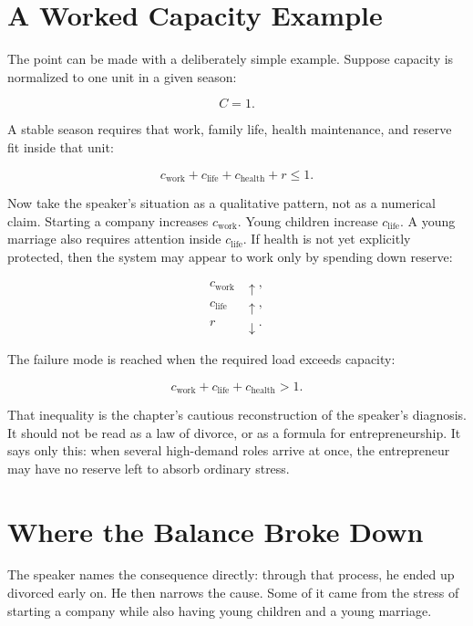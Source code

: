 \section{A Worked Capacity Example}

The point can be made with a deliberately simple example. Suppose capacity is normalized to one unit in a given season:

\begin{equation}
C=1.
\end{equation}

A stable season requires that work, family life, health maintenance, and reserve fit inside that unit:

\begin{equation}
c_{\text{work}}+c_{\text{life}}+c_{\text{health}}+r \leq 1.
\end{equation}

Now take the speaker's situation as a qualitative pattern, not as a numerical claim. Starting a company increases \(c_{\text{work}}\). Young children increase \(c_{\text{life}}\). A young marriage also requires attention inside \(c_{\text{life}}\). If health is not yet explicitly protected, then the system may appear to work only by spending down reserve:

\begin{align}
c_{\text{work}} &\uparrow,\\
c_{\text{life}} &\uparrow,\\
r &\downarrow.
\end{align}

The failure mode is reached when the required load exceeds capacity:

\begin{equation}
c_{\text{work}}+c_{\text{life}}+c_{\text{health}} > 1.
\end{equation}

That inequality is the chapter's cautious reconstruction of the speaker's diagnosis. It should not be read as a law of divorce, or as a formula for entrepreneurship. It says only this: when several high-demand roles arrive at once, the entrepreneur may have no reserve left to absorb ordinary stress.

\section{Where the Balance Broke Down}

The speaker names the consequence directly: through that process, he ended up divorced early on. He then narrows the cause. Some of it came from the stress of starting a company while also having young children and a young marriage.

